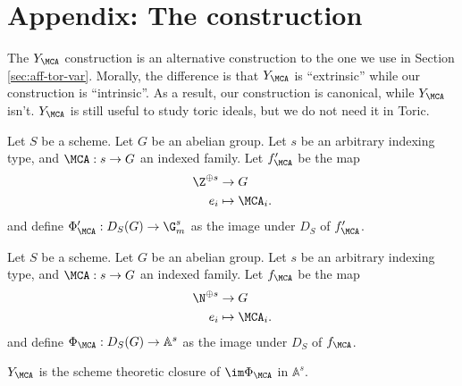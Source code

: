 \section{Appendix: The  construction}


The $Y_\MCA$ construction is an alternative construction to the one
we use in Section \ref{sec:aff-tor-var}.
Morally, the difference is that $Y_\MCA$ is ``extrinsic'' while our construction is ``intrinsic''.
As a result, our construction is canonical, while $Y_\MCA$ isn't.
$Y_\MCA$ is still useful to study toric ideals, but we do not need it in Toric.


\begin{definition}
  \label{1-1-phiAprime}

  Let $S$ be a scheme. Let $G$ be an abelian group.
  Let $s$ be an arbitrary indexing type, and $\MCA : s \to G$ an indexed family.
  Let $f'_\MCA$ be the map
  \begin{align*}
    \Z^{\oplus s} & \to G \\
    e_i & \mapsto \MCA_i.
  \end{align*}
  and define $\Phi'_\MCA : D_S(G) \to \G_m^s$ as the image under $D_S$ of $f'_\MCA$.
\end{definition}


\begin{definition}
  \label{1-1-phiA}

  Let $S$ be a scheme. Let $G$ be an abelian group.
  Let $s$ be an arbitrary indexing type, and $\MCA : s \to G$ an indexed family.
  Let $f_\MCA$ be the map
  \begin{align*}
    \N^{\oplus s} & \to G \\
    e_i & \mapsto \MCA_i.
  \end{align*}
  and define $\Phi_\MCA : D_S(G) \to \mathbb A^s$ as the image under $D_S$ of $f_\MCA$.
\end{definition}


\begin{definition}
  \label{1-1-7-ya}

  $Y_\MCA$ is the scheme theoretic closure of $\im \Phi_\MCA$ in $\mathbb A^s$.
\end{definition}


